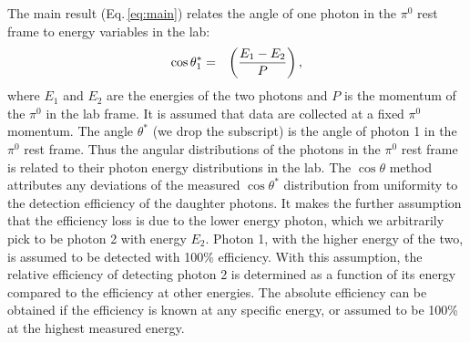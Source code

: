 \documentclass[12pt]{article}
\begin{document}
The main result (Eq.\,\ref{eq:main}) relates the angle of one photon in the $\pi^0$ rest frame to energy variables in the lab:
\begin{eqnarray}
\cos{\theta^*_1} & = & \left( {E_1 - E_2  \over P } \right),     \label{eq:main2}
\end{eqnarray}
where $E_1$ and $E_2$ are the energies of the two photons and $P$ is the momentum of the $\pi^0$ in the lab frame. It is assumed that data are collected at a fixed $\pi^0$ momentum. 
The angle $\theta^*$ (we drop the subscript) is the angle of photon 1 in the $\pi^0$ rest frame. Thus the 
angular distributions of the photons in the $\pi^0$ rest frame is related to their photon energy distributions in the lab. The $\cos{\theta}$ method attributes any deviations of the 
measured $\cos{\theta^*}$ distribution from uniformity to the detection efficiency of the daughter photons. It makes the further assumption that the efficiency loss is due to the lower energy photon, which
we arbitrarily pick to be photon 2 with energy $E_2$. Photon 1, with the higher energy of the two, is assumed to be detected with 100\% efficiency.  With this assumption, the relative efficiency of detecting
photon 2 is determined as a function of its energy compared to the efficiency at other energies. The absolute efficiency can be obtained if the efficiency is known at any specific energy, or assumed to be
100\% at the highest measured energy.
\end{document}
